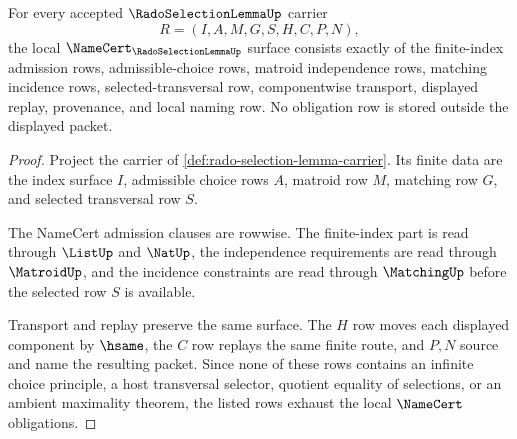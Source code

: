 \begin{theorem}
\label{thm:rado-selection-lemma-namecert-obligations}
For every accepted $\RadoSelectionLemmaUp$ carrier
$$
R=(I,A,M,G,S,H,C,P,N),
$$
the local $\NameCert_{\RadoSelectionLemmaUp}$ surface consists exactly of the finite-index admission rows, admissible-choice rows, matroid independence rows, matching incidence rows, selected-transversal row, componentwise transport, displayed replay, provenance, and local naming row. No obligation row is stored outside the displayed packet.
\end{theorem}
\begin{proof}
Project the carrier of \autoref{def:rado-selection-lemma-carrier}. Its finite data are the index surface $I$, admissible choice rows $A$, matroid row $M$, matching row $G$, and selected transversal row $S$.

The NameCert admission clauses are rowwise. The finite-index part is read through $\ListUp$ and $\NatUp$, the independence requirements are read through $\MatroidUp$, and the incidence constraints are read through $\MatchingUp$ before the selected row $S$ is available.

Transport and replay preserve the same surface. The $H$ row moves each displayed component by $\hsame$, the $C$ row replays the same finite route, and $P,N$ source and name the resulting packet. Since none of these rows contains an infinite choice principle, a host transversal selector, quotient equality of selections, or an ambient maximality theorem, the listed rows exhaust the local $\NameCert$ obligations.
\end{proof}


\begin{closurestatus}{\RadoSelectionLemmaUp}
  \theoryclosure{\seedClosure}
  \formalstatus{\unformalizedV}
\end{closurestatus}
